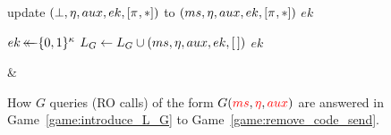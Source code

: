 \begin{figure}
\begin{fullpage}
\begin{adjustbox}{tabular={cc},Trim=0.5ex 0 0 0, width=\textwidth}
\begin{adjustbox}{minipage=[t][]{\codewidth},fbox}
\begin{algorithmic}[1]
			\State \hspace*{-\algorithmicindent} 
				\label{alg:proof:EAP-TLS:G-code:CheckKey}
				\State update $(\bot, \nonce, aux, ek, [\oracle,*])$ to $(ms, \nonce, aux, ek, [\oracle,*])$
				\State \Return $ek$ 	
			
			\color{black}
		
			\Else
				\State {}
				\State $ek \operatorname{\leftarrow\mathrel{\mkern-14mu}\leftarrow} \lbrace 0, 1 \rbrace^\kappa$
				\State $L_G \gets L_G \cup (ms, \eta, aux, ek, [\,]) $
				\State \Return $ek$
			\EndIf	
		\end{algorithmic}
	\end{adjustbox} %
	
	&
	
\end{adjustbox}


\caption{How $G$ queries (RO calls) of the form $G(\textcolor{red}{ms},\textcolor{red}{\eta},\textcolor{red}{aux})$ are answered in Game~\ref{game:introduce_L_G} to Game~\ref{game:remove_code_send}.}
\label{fig:code_for_game_hops_G}

\end{fullpage}

\end{figure}